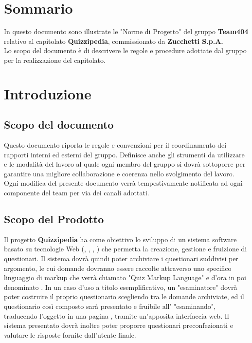 \documentclass[a4paper,11pt]{article}
\begin{document}
	\listoffigures
	
	\newpage
	\section*{Sommario}
		In questo documento sono illustrate le "Norme di Progetto" del gruppo \textbf{Team404} relativo al capitolato \textbf{Quizzipedia}, commissionato da \textbf{Zucchetti S.p.A.} \\
		Lo scopo del documento è di descrivere le regole e procedure adottate dal gruppo per la realizzazione del capitolato. 
	\newpage
	\section{Introduzione}
	
		\subsection{Scopo del documento}
			Questo documento riporta le regole e convenzioni per il coordinamento dei rapporti interni ed esterni del gruppo. Definisce anche gli strumenti da utilizzare e le modalit\`a del lavoro al quale ogni membro del gruppo si dovr\`a sottoporre per garantire una migliore collaborazione e coerenza nello svolgimento del lavoro.\\
		Ogni modifica del presente documento verr\`a tempestivamente notificata ad ogni componente del team per via dei canali adottati.
		\subsection{Scopo del Prodotto}
			Il progetto \textbf{Quizzipedia} ha come obiettivo lo sviluppo di un sistema software basato su tecnologie Web (, , , ) che permetta la creazione, gestione e fruizione di questionari. Il sistema dovrà quindi poter archiviare i questionari suddivisi per argomento, le cui domande dovranno essere raccolte attraverso uno specifico linguaggio di markup che verrà chiamato "Quiz Markup Language" e d'ora in poi denominato . In un caso d'uso a titolo esemplificativo, un "esaminatore" dovrà poter costruire il proprio questionario scegliendo tra le domande archiviate, ed il questionario così composto sarà presentato e fruibile all' "esaminando", traducendo l'oggetto  in una pagina , tramite un'apposita interfaccia web. Il sistema presentato dovrà inoltre poter proporre questionari preconfezionati e valutare le risposte fornite dall'utente finale.	\\
\end{document}
